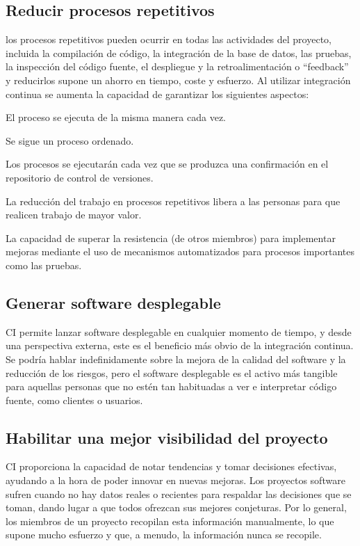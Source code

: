 \subsection{Reducir procesos repetitivos}
los procesos repetitivos pueden ocurrir en todas las actividades del proyecto, incluida la compilación de código, la integración de la base de datos, las pruebas, la inspección del código fuente, el despliegue y la retroalimentación o “feedback” y reducirlos supone un ahorro en tiempo, coste y esfuerzo. Al utilizar integración continua se aumenta la capacidad de garantizar los siguientes aspectos:
\begin{compactitem}
    \item El proceso se ejecuta de la misma manera cada vez.
    \item Se sigue un proceso ordenado.
    \item Los procesos se ejecutarán cada vez que se produzca una confirmación en el repositorio de control de versiones. 
    \item La reducción del trabajo en procesos repetitivos libera a las personas para que realicen trabajo de mayor valor.
    \item La capacidad de superar la resistencia (de otros miembros) para implementar mejoras mediante el uso de mecanismos automatizados para procesos importantes como las pruebas.
\end{compactitem}
\subsection{Generar software desplegable}
CI permite lanzar software desplegable en cualquier momento de tiempo, y desde una perspectiva externa, este es el beneficio más obvio de la integración continua. Se podría hablar indefinidamente sobre la mejora de la calidad del software y la reducción de los riesgos, pero el software desplegable es el activo más tangible para aquellas personas que no estén tan habituadas a ver e interpretar código fuente, como clientes o usuarios.
\subsection{Habilitar una mejor visibilidad del proyecto}
CI proporciona la capacidad de notar tendencias y tomar decisiones efectivas, ayudando a la hora de poder innovar en nuevas mejoras. Los proyectos software sufren cuando no hay datos reales o recientes para respaldar las decisiones que se toman, dando lugar a que todos ofrezcan sus mejores conjeturas. Por lo general, los miembros de un proyecto recopilan esta información manualmente, lo que supone mucho esfuerzo y que, a menudo, la información nunca se recopile. 

